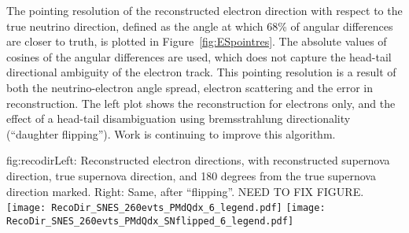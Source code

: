 
The pointing resolution of the reconstructed electron direction with
respect to the true neutrino direction, defined as the angle at which
68\% of angular differences are closer to truth, is plotted in
Figure~\ref{fig:ESpointres}.
The absolute values of cosines of the
angular differences are used, which does not capture the head-tail
directional ambiguity of the electron track.
This pointing resolution is a result of both the neutrino-electron
angle spread, electron scattering and the error in reconstruction.  The left plot shows the
reconstruction for electrons only, and the effect of a head-tail disambiguation
using bremsstrahlung directionality (``daughter flipping'').  Work is
continuing to improve this algorithm.






\begin{dunefigure}{fig:recodir}{Left: Reconstructed
    electron directions, with reconstructed supernova direction, true
    supernova direction, and 180 degrees from the true supernova
    direction marked. Right: Same, after ``flipping''. NEED TO
    FIX FIGURE.}
\texttt{[image: RecoDir\_SNES\_260evts\_PMdQdx\_6\_legend.pdf]}
\texttt{[image: RecoDir\_SNES\_260evts\_PMdQdx\_SNflipped\_6\_legend.pdf]}
\end{dunefigure}


